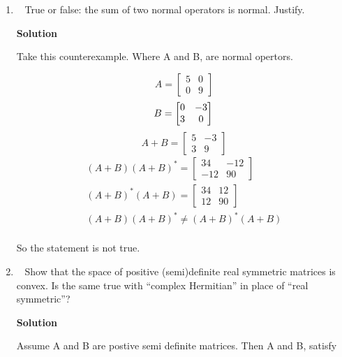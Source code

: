 \documentclass[11pt]{article}
\makeatletter
\newcommand\score[1]{\marginpar{\vspace{-2ex}\color{blue}{#1/3}}\hspace{-1ex}}
\newcommand\0{\mathbf{0}}
\newcommand\<{\langle}
\renewcommand\>{\rangle}
\newcommand\twobytwo[1]{\left[\begin{array}{@{}cc@{}}#1\end{array}\right]}
\makeatother
\begin{document}
\begin{enumerate}
\begin{align*}
  \psi (v)&= v^{'} \text{\; By Defintion.}\\ 
  \psi^{*}(v^{'})&=v \text{\; Because }\varphi^{*}=\varphi^{-1}
\end{align*}

So make the block matrix 
$$%
  \twobytwo{ \0  & -\psi^*
          \\ \psi &    \0 }
$$%

Which takes $x=w+w^{'}$ to $w' - w$, and $w' - w$ to $ -w' - w$, which satisifies
the original function.

\item\ \score{3}%
True or false: the sum of two normal operators is normal.  Justify.

\textbf{Solution}

Take this counterexample. Where A and B, are normal opertors.   

$$
A=
\begin{bmatrix}
  5& 0\\
  0& 9
\end{bmatrix}
$$
$$
B=
\begin{bmatrix}
  0& -3\\
  3& 0
\end{bmatrix}\\
$$
$$
A+B=
\begin{bmatrix}
5&-3\\
3&9
\end{bmatrix}
$$
\begin{align*}
  (A+B)(A+B)^{*}=
  \begin{bmatrix}
    34& -12\\
    -12& 90
  \end{bmatrix}\\
  (A+B)^{*}(A+B)=
  \begin{bmatrix}
  34& 12\\
  12& 90
\end{bmatrix}    \\
 (A+B)(A+B)^{*}\neq(A+B)^{*}(A+B)\\
\end{align*}

So the statement is not true.
\item\ \score{3}%
Show that the space of positive (semi)definite real symmetric
matrices is convex.  Is the same true with ``complex Hermitian'' in
place of ``real symmetric''?

\textbf{Solution}

Assume A and B are postive semi definite matrices. Then A and B, satisfy


\end{enumerate}
\end{document}
